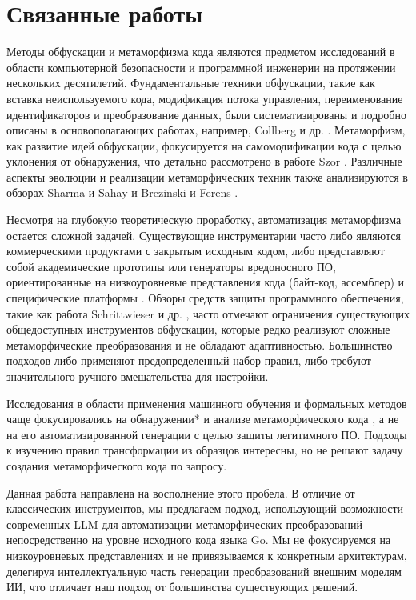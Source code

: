 
\section{Связанные работы}
\label{sec:conclusio}
Методы обфускации и метаморфизма кода являются предметом исследований в области компьютерной безопасности и программной инженерии на протяжении нескольких десятилетий. Фундаментальные техники обфускации, такие как вставка неиспользуемого кода, модификация потока управления, переименование идентификаторов и преобразование данных, были систематизированы и подробно описаны в основополагающих работах, например, Collberg и др. \cite{Collberg97Survey}. Метаморфизм, как развитие идей обфускации, фокусируется на самомодификации кода с целью уклонения от обнаружения, что детально рассмотрено в работе Szor \cite{Szor05Metamorphic}. Различные аспекты эволюции и реализации метаморфических техник также анализируются в обзорах Sharma и Sahay \cite{Sharma14Evolution} и Brezinski и Ferens \cite{Brezinski21Survey}.

Несмотря на глубокую теоретическую проработку, автоматизация метаморфизма остается сложной задачей. Существующие инструментарии часто либо являются коммерческими продуктами с закрытым исходным кодом, либо представляют собой академические прототипы или генераторы вредоносного ПО, ориентированные на низкоуровневые представления кода (байт-код, ассемблер) и специфические платформы \cite{Brezinski21Survey}. Обзоры средств защиты программного обеспечения, такие как работа Schrittwieser и др. \cite{Schrittwieser16Survey}, часто отмечают ограничения существующих общедоступных инструментов обфускации, которые редко реализуют сложные метаморфические преобразования и не обладают адаптивностью. Большинство подходов либо применяют предопределенный набор правил, либо требуют значительного ручного вмешательства для настройки.

Исследования в области применения машинного обучения и формальных методов чаще фокусировались на обнаружении* и анализе метаморфического кода \cite{Wong06Hunting, Campion21Learning}, а не на его автоматизированной генерации с целью защиты легитимного ПО. Подходы к изучению правил трансформации из образцов \cite{Campion21Learning} интересны, но не решают задачу создания метаморфического кода по запросу.

Данная работа направлена на восполнение этого пробела. В отличие от классических инструментов, мы предлагаем подход, использующий возможности современных LLM для автоматизации метаморфических преобразований непосредственно на уровне исходного кода языка Go. Мы не фокусируемся на низкоуровневых представлениях и не привязываемся к конкретным архитектурам, делегируя интеллектуальную часть генерации преобразований внешним моделям ИИ, что отличает наш подход от большинства существующих решений.

